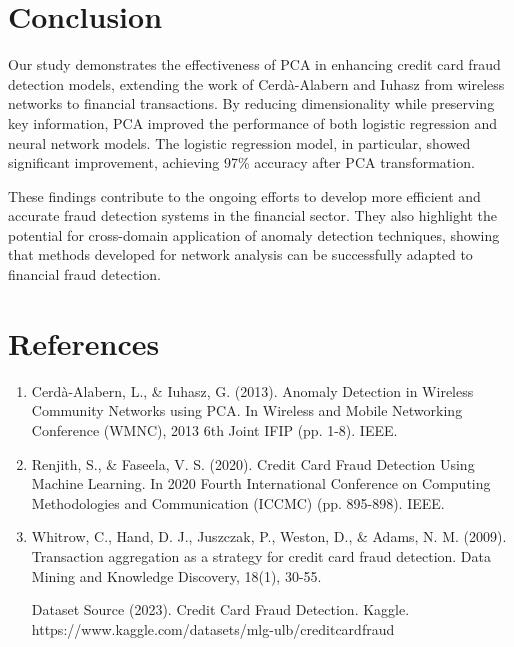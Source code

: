 \documentclass{article}
\begin{document}
\section{Conclusion}
Our study demonstrates the effectiveness of PCA in enhancing credit card fraud detection models, extending the work of Cerdà-Alabern and Iuhasz from wireless networks to financial transactions. By reducing dimensionality while preserving key information, PCA improved the performance of both logistic regression and neural network models. The logistic regression model, in particular, showed significant improvement, achieving 97\% accuracy after PCA transformation. 

These findings contribute to the ongoing efforts to develop more efficient and accurate fraud detection systems in the financial sector. They also highlight the potential for cross-domain application of anomaly detection techniques, showing that methods developed for network analysis can be successfully adapted to financial fraud detection.

\section{References}
\begin{enumerate}
    \item Cerdà-Alabern, L., \& Iuhasz, G. (2013). Anomaly Detection in Wireless Community Networks using PCA. In Wireless and Mobile Networking Conference (WMNC), 2013 6th Joint IFIP (pp. 1-8). IEEE.
    
    \item Renjith, S., \& Faseela, V. S. (2020). Credit Card Fraud Detection Using Machine Learning. In 2020 Fourth International Conference on Computing Methodologies and Communication (ICCMC) (pp. 895-898). IEEE.
    
    \item Whitrow, C., Hand, D. J., Juszczak, P., Weston, D., \& Adams, N. M. (2009). Transaction aggregation as a strategy for credit card fraud detection. Data Mining and Knowledge Discovery, 18(1), 30-55.
    
    \item [Dataset Source] (2023). Credit Card Fraud Detection. Kaggle. https://www.kaggle.com/datasets/mlg-ulb/creditcardfraud
\end{enumerate}
\end{document}

